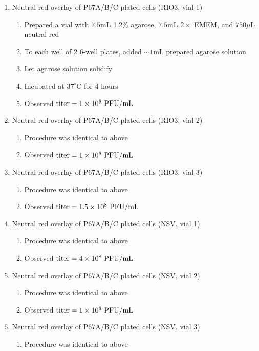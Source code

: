 \begin{enumerate}
	\item Neutral red overlay of P67A/B/C plated cells (RIO3, vial 1)
		\begin{enumerate}
			\item Prepared a vial with $7.5$mL 1.2\% agarose, $7.5$mL $2\times$ EMEM, and $750\mu$L neutral red
			\item To each well of 2 6-well plates, added $\sim 1$mL prepared agarose solution
			\item Let agarose solution solidify
			\item Incubated at $37^{\circ}$C for 4 hours
			\item Observed $\text{titer}=1\times 10^{8}\text{ PFU/mL}$
		\end{enumerate}
	\item Neutral red overlay of P67A/B/C plated cells (RIO3, vial 2)
		\begin{enumerate}
			\item Procedure was identical to above
			\item Observed $\text{titer}=1\times 10^{8}\text{ PFU/mL}$
		\end{enumerate}
	\item Neutral red overlay of P67A/B/C plated cells (RIO3, vial 3)
		\begin{enumerate}
			\item Procedure was identical to above
			\item Observed $\text{titer}=1.5\times 10^{8}\text{ PFU/mL}$
		\end{enumerate}
	\item Neutral red overlay of P67A/B/C plated cells (NSV, vial 1)
		\begin{enumerate}
			\item Procedure was identical to above
			\item Observed $\text{titer}=4\times 10^{8}\text{ PFU/mL}$
		\end{enumerate}
	\item Neutral red overlay of P67A/B/C plated cells (NSV, vial 2)
		\begin{enumerate}
			\item Procedure was identical to above
			\item Observed $\text{titer}=1\times 10^{8}\text{ PFU/mL}$
		\end{enumerate}
	\item Neutral red overlay of P67A/B/C plated cells (NSV, vial 3)
		\begin{enumerate}
			\item Procedure was identical to above

\end{enumerate}
\end{enumerate}
